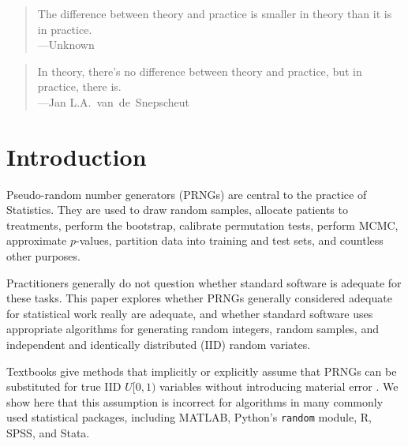 \documentclass[graybox]{svmult}
\begin{document}

\begin{quotation}
The difference between theory and practice is smaller in theory than it is in practice. \\ ---Unknown
\end{quotation}


\begin{quotation}
In theory, there's no difference between theory and practice, but in practice, there is. \\ ---Jan L.A.~van~de~Snepscheut
\end{quotation}

\section{Introduction}
\label{sec:introduction}


Pseudo-random number generators (PRNGs) are central to the practice of Statistics.
They are used to draw random samples, allocate patients to treatments, perform the bootstrap, 
calibrate permutation tests, perform MCMC, approximate $p$-values, partition data into training and test sets, and countless other purposes.

Practitioners generally do not question whether standard software is adequate for these tasks.
This paper explores whether PRNGs generally considered adequate for statistical work really are
adequate, and whether standard software uses appropriate algorithms for generating random integers, random samples,
and independent and identically distributed (IID) random variates.


Textbooks give methods that implicitly or explicitly assume that PRNGs 
can be substituted for true IID $U[0,1)$ variables without introducing material error 
\cite{stine_statistics_2014, leblanc_statistics_2004, dahlberg_practical_2010, press_numerical_1988, peck_introduction_2011}.
We show here that this assumption is incorrect for algorithms in many commonly used statistical packages,
including MATLAB, Python's \texttt{random} module, R, SPSS, and Stata.
\end{document}
